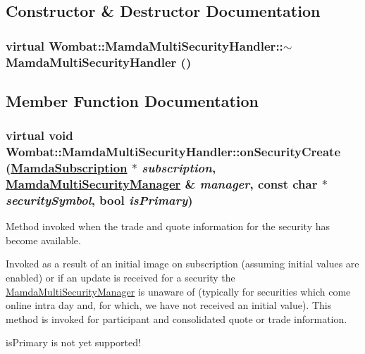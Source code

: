 \subsection{Constructor \& Destructor Documentation}
\hypertarget{classWombat_1_1MamdaMultiSecurityHandler_a049866a536c746797401f3d41380cf1}{
\subsubsection[$\sim$MamdaMultiSecurityHandler]{\setlength{\rightskip}{0pt plus 5cm}virtual Wombat::Mamda\-Multi\-Security\-Handler::$\sim$Mamda\-Multi\-Security\-Handler ()}}
\label{classWombat_1_1MamdaMultiSecurityHandler_a049866a536c746797401f3d41380cf1}




\subsection{Member Function Documentation}
\hypertarget{classWombat_1_1MamdaMultiSecurityHandler_e9facdb0af49b6cf3974c16f0ae2f0df}{
\subsubsection[onSecurityCreate]{\setlength{\rightskip}{0pt plus 5cm}virtual void Wombat::Mamda\-Multi\-Security\-Handler::on\-Security\-Create (\hyperlink{classWombat_1_1MamdaSubscription}{Mamda\-Subscription} $\ast$ {\em subscription}, \hyperlink{classWombat_1_1MamdaMultiSecurityManager}{Mamda\-Multi\-Security\-Manager} \& {\em manager}, const char $\ast$ {\em security\-Symbol}, bool {\em is\-Primary})}}
\label{classWombat_1_1MamdaMultiSecurityHandler_e9facdb0af49b6cf3974c16f0ae2f0df}


Method invoked when the trade and quote information for the security has become available. 

Invoked as a result of an initial image on subscription (assuming initial values are enabled) or if an update is received for a security the \hyperlink{classWombat_1_1MamdaMultiSecurityManager}{Mamda\-Multi\-Security\-Manager} is unaware of (typically for securities which come online intra day and, for which, we have not received an initial value). This method is invoked for participant and consolidated quote or trade information.

is\-Primary is not yet supported! 